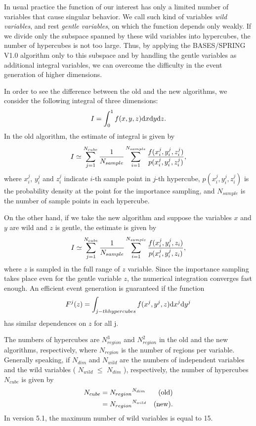 \vskip 1.0cm
\def\d{{\rm d}}
\bigskip
\par
In usual practice the function of our interest has only a limited
number of variables that cause singular behavior. 
We call such kind of variables {\it wild variables}, and rest  {\it gentle
variables}, on which the function depends only weakly.  If we divide only the
subspace spanned by these wild variables into hypercubes, the number of
hypercubes is not too large.  Thus, by applying the {\small BASES/SPRING V1.0}
algorithm only to this subspace and by handling the gentle variables as
additional integral variables, we can overcome the difficulty in the event
generation of higher dimensions.

In order to see the difference between the old and the new algorithms, we
consider the following integral of three dimensions: 
\[
 I = \int\nolimits_0^1 f(x,y,z)  \d x \d y \d z.
\]
In the old algorithm, the estimate of integral is given by
\[
 I \simeq \sum_{j=1}^{N_{cube}} {1\over{N_{sample}}}
 \sum_{i=1}^{N_{sample}}{ f(x_i^j, y_i^j, z_i^j) \over p(x_i^j, y_i^j, z_i^j)},
\]
\noindent
where $x_i^j$, $y_i^j$ and $z_i^j$ indicate $i$-th sample point in $j$-th
hypercube,  $p(x_i^j, y_i^j, z_i^j)$ is the probability density at the point for
the importance sampling, and $N_{sample}$ is the number of sample points in each
hypercube. \par 
On the other hand, if we take the new algorithm and suppose the variables $x$ 
and $y$ are wild and $z$ is gentle, the estimate is given by 
\[
 I \simeq \sum_{j=1}^{N_{cube}} {1\over{N_{sample}}}
 \sum_{i=1}^{N_{sample}}{ f(x_i^j, y_i^j, z_i) \over p(x_i^j, y_i^j, z_i)},
\]
\noindent
where $z$ is sampled in the full range of $z$ variable.
Since the importance sampling takes place even for the gentle variable $z$, the
numerical integration converges fast enough.  An efficient event generation is
guaranteed if the function 
\[
F^j( z ) =  \int\nolimits_{j-th hypercubes} f( x^j, y^j, z )  \d x^j \d y^j
\]
has similar dependences on $z$ for all j.

The numbers of hypercubes are $N_{region}^3$ and $N_{region}^2$ in the old and the
new algorithms, respectively, where $N_{region}$ is the number of regions per
variable. Generally speaking, if $N_{dim}$ and $N_{wild}$ are the numbers of
independent variables and the wild variables ( $N_{wild}$ $\le$ $N_{dim}$ ),
respectively, the number of hypercubes $N_{cube}$ is given by
\begin{eqnarray*}
 N_{cube}    & =  {N_{region}}^{N_{dim}} &{\rm (old)}\cr
      ~      & =  {N_{region}}^{N_{wild}} &{\rm (new).}
\end{eqnarray*}
In version 5.1, the maximum number of wild variables is equal to 15.
